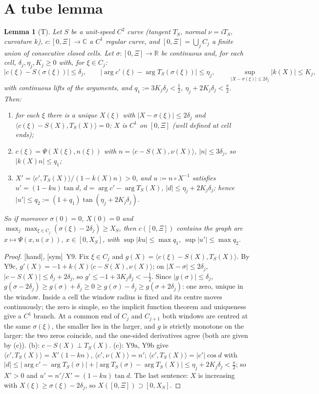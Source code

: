 \documentclass[11pt]{article}
\newtheorem{lemma}{Lemma}[section]\newtheorem{definition}[lemma]{Definition}\newtheorem{remark}[lemma]{Remark}
\newcommand{\tH}{\textup{[hand]}}\newcommand{\tS}{\textup{[sym]}}\newcommand{\tC}{\textup{[cert]}}\newcommand{\tI}{\textup{[cited]}}
\newcommand{\ip}[2]{\langle#1,#2\rangle}
\begin{document}
\section{A tube lemma}
\begin{lemma}[T]\label{GS:lem:T}
Let $S$ be a unit-speed $C^2$ curve (tangent $T_S$, normal $\nu=iT_S$, curvature $k$), $c:[0,\Xi]\to\mathbb C$ a $C^1$ regular curve, and $[0,\Xi]=\bigcup_jC_j$ a finite union of consecutive closed cells. Let $\sigma:[0,\Xi]\to\mathbb R$ be continuous and, for each cell, $\delta_j,\eta_j,K_j\ge0$ with, for $\xi\in C_j$:
\[
|c(\xi)-S(\sigma(\xi))|\le\delta_j,\qquad|\arg c'(\xi)-\arg T_S(\sigma(\xi))|\le\eta_j,\qquad\sup_{|X-\sigma(\xi)|\le2\delta_j}|k(X)|\le K_j,
\]
with continuous lifts of the arguments, and $q_1:=3K_j\delta_j<\frac12$, $\eta_j+2K_j\delta_j<\frac\pi2$. Then:
\begin{enumerate}[label=(\alph*),leftmargin=2em]
\item for each $\xi$ there is a unique $X(\xi)$ with $|X-\sigma(\xi)|\le2\delta_j$ and $\ip{c(\xi)-S(X)}{T_S(X)}=0$; $X$ is $C^1$ on $[0,\Xi]$ (well defined at cell ends);
\item $c(\xi)=\Psi(X(\xi),n(\xi))$ with $n=\ip{c-S(X)}{\nu(X)}$, $|n|\le3\delta_j$, so $|k(X)n|\le q_1$;
\item $X'=\ip{c'}{T_S(X)}/(1-k(X)n)>0$, and $u:=n\circ X^{-1}$ satisfies $u'=(1-ku)\tan d$, $d=\arg c'-\arg T_S(X)$, $|d|\le\eta_j+2K_j\delta_j$; hence $|u'|\le q_2:=(1+q_1)\tan(\eta_j+2K_j\delta_j)$.
\end{enumerate}
So if moreover $\sigma(0)=0$, $X(0)=0$ and $\max_j\max_{\xi\in C_j}(\sigma(\xi)-2\delta_j)\ge X_S$, then $c([0,\Xi])$ contains the graph arc $x\mapsto\Psi(x,u(x))$, $x\in[0,X_S]$, with $\sup|ku|\le\max q_1$, $\sup|u'|\le\max q_2$.
\end{lemma}
\begin{proof}\tH, \tS\ Y9. Fix $\xi\in C_j$ and $g(X)=\ip{c(\xi)-S(X)}{T_S(X)}$. By Y9c, $g'(X)=-1+k(X)\ip{c-S(X)}{\nu(X)}$; on $|X-\sigma|\le2\delta_j$, $|c-S(X)|\le\delta_j+2\delta_j$, so $g'\le-1+3K_j\delta_j<-\frac12$. Since $|g(\sigma)|\le\delta_j$, $g(\sigma-2\delta_j)\ge g(\sigma)+\delta_j\ge0\ge g(\sigma)-\delta_j\ge g(\sigma+2\delta_j)$: one zero, unique in the window. Inside a cell the window radius is fixed and its centre moves continuously; the zero is simple, so the implicit function theorem and uniqueness give a $C^1$ branch. At a common end of $C_j$ and $C_{j+1}$ both windows are centred at the same $\sigma(\xi)$, the smaller lies in the larger, and $g$ is strictly monotone on the larger: the two zeros coincide, and the one-sided derivatives agree (both are given by (c)). (b): $c-S(X)\perp T_S(X)$. (c): Y9a, Y9b give $\ip{c'}{T_S(X)}=X'(1-kn)$, $\ip{c'}{\nu(X)}=n'$; $\ip{c'}{T_S(X)}=|c'|\cos d$ with $|d|\le|\arg c'-\arg T_S(\sigma)|+|\arg T_S(\sigma)-\arg T_S(X)|\le\eta_j+2K_j\delta_j<\frac\pi2$; so $X'>0$ and $u'=n'/X'=(1-ku)\tan d$. The last sentence: $X$ is increasing with $X(\xi)\ge\sigma(\xi)-2\delta_j$, so $X([0,\Xi])\supset[0,X_S]$.
\end{proof}
\end{document}
